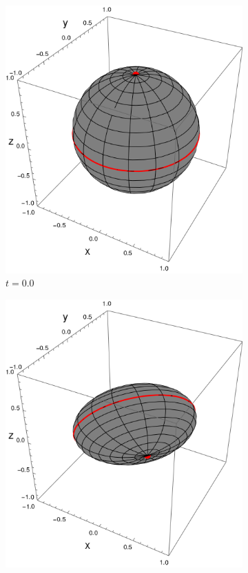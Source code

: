 \begin{figure}[h!]
    \centering
    \begin{subfigure}{0.32\textwidth}
      \centering
      \includegraphics[width=0.9\linewidth]{maxent/figures/U1xU2_H1=Pi(sx+sy)_H2=Id_z=0.9_p=0.6t=0.png}
      \caption{$t=0.0$}
    \end{subfigure}%
    \begin{subfigure}{0.32\textwidth}
      \centering
      \includegraphics[width=0.9\linewidth]{maxent/figures/U1xU2_H1=Pi(sx+sy)_H2=Id_z=0.9_p=0.6t=0.3.png}

\end{subfigure}
\end{figure}
